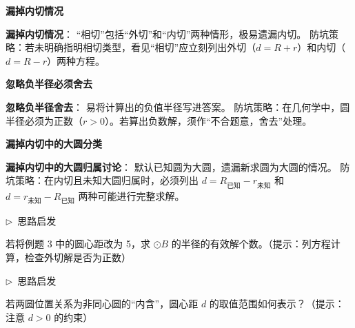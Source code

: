 \documentclass{exam-zh}
\newcommand{\edukai}{\kaishu}
\newcommand{\eduSubTitle}[1]{%
  \needspace{4\baselineskip}%
  \vspace{1mm}
  {\color{edu-blue}\bfseries #1}\par
  \vspace{1mm}
}
\newenvironment{eduAuxItem}[1]{%
  \needspace{4\baselineskip}%
  \vspace{2mm}
  \par\noindent
  \hangindent=8mm\hangafter=1
  {\color{edu-blue}\edukai $\triangleright$~#1}\enspace
  \begingroup
  \color{edu-ink}
  \edukai
}{%
  \endgroup
  \par
  \vspace{4mm}
}
\begin{document}
\begin{eduMistakeBox}
\eduSubTitle{漏掉内切情况}\textbf{漏掉内切情况}：
“相切”包括“外切”和“内切”两种情形，极易遗漏内切。
防坑策略：若未明确指明相切类型，看见“相切”应立刻列出外切（$d=R+r$）和内切（$d=R-r$）两种方程。
\end{eduMistakeBox}




\begin{eduMistakeBox}
\eduSubTitle{忽略负半径必须舍去}\textbf{忽略负半径舍去}：
易将计算出的负值半径写进答案。
防坑策略：在几何学中，圆半径必须为正数（$r > 0$）。若算出负数解，须作“不合题意，舍去”处理。
\end{eduMistakeBox}




\begin{eduMistakeBox}
\eduSubTitle{漏掉内切中的大圆分类}\textbf{漏掉内切中的大圆归属讨论}：
默认已知圆为大圆，遗漏新求圆为大圆的情况。
防坑策略：在内切且未知大圆归属时，必须列出 $d = R_{已知} - r_{未知}$ 和 $d = r_{未知} - R_{已知}$ 两种可能进行完整求解。
\end{eduMistakeBox}




\begin{eduAuxItem}{思路启发}
若将例题 3 中的圆心距改为 5，求 $\odot B$ 的半径的有效解个数。（提示：列方程计算，检查外切解是否为正数）\end{eduAuxItem}




\begin{eduAuxItem}{思路启发}
若两圆位置关系为非同心圆的“内含”，圆心距 $d$ 的取值范围如何表示？（提示：注意 $d > 0$ 的约束）\end{eduAuxItem}
\end{document}

